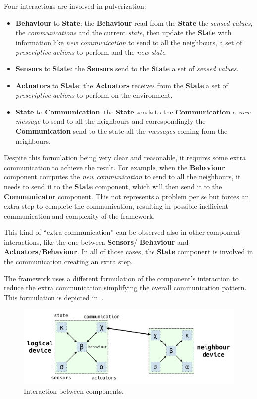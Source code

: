 Four interactions are involved in pulverization:
\begin{itemize}
	\item \textbf{Behaviour} to \textbf{State}: the \textbf{Behaviour} read from the \textbf{State} the \textit{sensed values}, the \textit
	      {communications} and the current \textit{state}, then update the \textbf{State} with information like \textit{new communication} to send to
	      all the neighbours, a set of \textit{prescriptive actions} to perform and the \textit{new state}.
	\item \textbf{Sensors} to \textbf{State}: the \textbf{Sensors} send to the \textbf{State} a set of \textit{sensed values}.
	\item \textbf{Actuators} to \textbf{State}: the \textbf{Actuators} receives from the \textbf{State} a set of \textit{prescriptive actions} to
	      perform on the environment.
	\item \textbf{State} to \textbf{Communication}: the \textbf{State} sends to the \textbf{Communication} a \textit{new message}
	      to send to all the neighbours and correspondingly the \textbf{Communication} send to the state all the \textit{messages} coming from the
	      neighbours.
\end{itemize}

Despite this formulation being very clear and reasonable, it requires some extra communication to achieve the result.
For example, when the \textbf{Behaviour} component computes the \textit{new communication} to send to all the neighbours, it needs to send it to the
\textbf{State} component, which will then send it to the \textbf{Communicator} component. This not represents a problem per se but forces an extra
step to complete the communication, resulting in possible inefficient communication and complexity of the framework.

This kind of ``extra communication'' can be observed also in other component interactions, like the one between \textbf{Sensors}/
\textbf{Behaviour} and \textbf{Actuators}/\textbf{Behaviour}. In all of those cases, the \textbf{State} component is involved in the
communication creating an extra step.

The framework uses a different formulation of the component's interaction to reduce the extra communication simplifying the overall communication
pattern. This formulation is depicted in~.

\begin{figure}[ht]
	\centering
	\includegraphics[width=\textwidth]{figures/framework-components-interactions.pdf}
	\caption{Interaction between components.}
	\label{fig:framework-components-interaction-2}
\end{figure}

